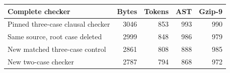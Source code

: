 \begin{center}
\small
\begin{tabular}{@{}lrrrr@{}}
\toprule
Complete checker & Bytes & Tokens & AST & Gzip-9\\
\midrule
Pinned three-case clausal checker & 3046 & 853 & 993 & 990\\
Same source, root case deleted & 2999 & 848 & 986 & 979\\
New matched three-case control & 2861 & 808 & 888 & 985\\
New two-case checker & 2787 & 794 & 868 & 972\\
\bottomrule
\end{tabular}
\end{center}
